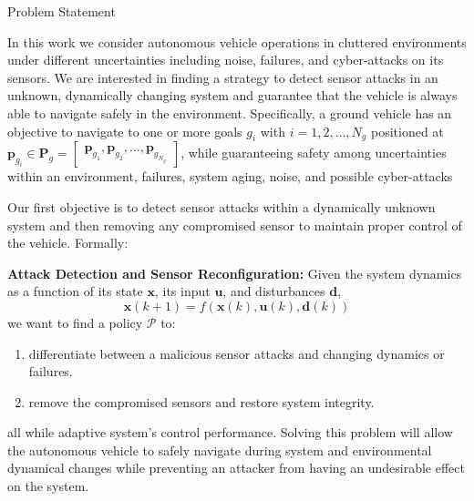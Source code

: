 \begin{section}{Problem Statement}
	
\label{sec:problem}

In this work we consider autonomous vehicle operations in cluttered environments under different uncertainties including noise, failures, and cyber-attacks on its sensors. 
We are interested in finding a strategy to detect sensor attacks in an unknown, dynamically changing system and guarantee that the vehicle is always able to navigate safely in the environment. Specifically, a ground vehicle has an objective to navigate to one or more goals $g_i$ with $ i = 1, 2, \dots, N_g$ positioned at $\bm{p}_{g_i} \in \bm{P}_g =  \begin{bmatrix} \bm{p}_{g_1},\bm{p}_{g_2},\dots,\bm{p}_{g_{N_g}} \end{bmatrix}$,  while guaranteeing safety among uncertainties within an environment, failures, system aging, noise, and possible cyber-attacks





Our first objective is to detect sensor attacks within a dynamically unknown system and then removing any compromised sensor to maintain proper control of the vehicle. Formally:

\begin{problem} 
\label{problem1} {\textbf{Attack Detection and Sensor Reconfiguration:}} 
 Given the system dynamics as a function of its state $ \bm{x} $, its input $ \bm{u}$, and disturbances $ \bm{d} $,
	\begin{equation}
		\bm{x}(k+1) = f(\bm{x}(k), \bm{u}(k), \bm{d}(k))
	\end{equation}
we want to find a policy $\mathcal{P}$ to:
\begin{enumerate}
	\item differentiate between a malicious sensor attacks and changing dynamics or failures. 
	\item remove the compromised sensors and restore system integrity. %
\end{enumerate}
	all while adaptive system's control performance.
Solving this problem will allow the autonomous vehicle to safely navigate during system and environmental dynamical changes while preventing an attacker from having an undesirable effect on the system. 
\end{problem}


\end{section}
